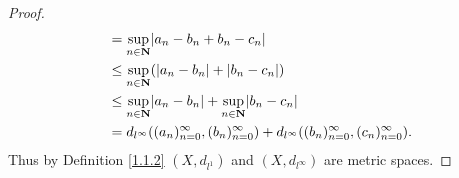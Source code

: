 \begin{proof}
\begin{align*}
                                                                 & = \sup_{n \in \mathbf{N}} \abs*{a_n - b_n + b_n - c_n}                                                                 \\
                                                                 & \leq \sup_{n \in \mathbf{N}} (\abs*{a_n - b_n} + \abs*{b_n - c_n})                                                     \\
                                                                 & \leq \sup_{n \in \mathbf{N}} \abs*{a_n - b_n} + \sup_{n \in \mathbf{N}} \abs*{b_n - c_n}                               \\
                                                                 & = d_{l^\infty}((a_n)_{n = 0}^\infty, (b_n)_{n = 0}^\infty) + d_{l^\infty}((b_n)_{n = 0}^\infty, (c_n)_{n = 0}^\infty).
    \end{align*}
    Thus by Definition \ref{1.1.2} \((X, d_{l^1})\) and \((X, d_{l^\infty})\) are metric spaces.


\end{proof}
